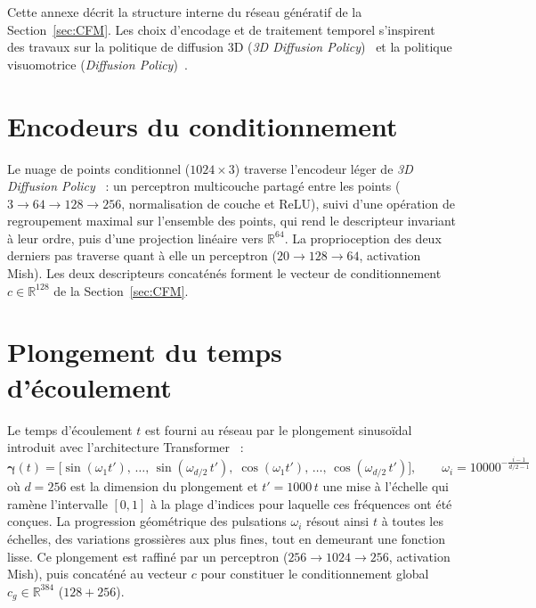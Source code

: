 \label{annexe:unet_details}

Cette annexe décrit la structure interne du réseau génératif de la Section~\ref{sec:CFM}. Les choix d'encodage et de traitement temporel s'inspirent des travaux sur la politique de diffusion 3D (\textit{3D Diffusion Policy})~\cite{Ze2024Diffusion} et la politique visuomotrice (\textit{Diffusion Policy})~\cite{ChiXXXXVisuomotor}.

\section*{Encodeurs du conditionnement}
Le nuage de points conditionnel ($1024\times3$) traverse l'encodeur léger de \textit{3D Diffusion Policy}~\cite{Ze2024Diffusion} : un perceptron multicouche partagé entre les points ($3\to64\to128\to256$, normalisation de couche et ReLU), suivi d'une opération de regroupement maximal sur l'ensemble des points, qui rend le descripteur invariant à leur ordre, puis d'une projection linéaire vers $\mathbb{R}^{64}$. La proprioception des deux derniers pas traverse quant à elle un perceptron ($20\to128\to64$, activation Mish). Les deux descripteurs concaténés forment le vecteur de conditionnement $c\in\mathbb{R}^{128}$ de la Section~\ref{sec:CFM}.

\section*{Plongement du temps d'écoulement}
Le temps d'écoulement $t$ est fourni au réseau par le plongement sinusoïdal introduit avec l'architecture Transformer~\cite{Vaswani2017Attention} :
\begin{equation}\label{eq:sinus_emb}
  \boldsymbol{\gamma}(t) = \bigl[\sin(\omega_1 t'),\,\dots,\,\sin(\omega_{d/2}\, t'),\;\cos(\omega_1 t'),\,\dots,\,\cos(\omega_{d/2}\, t')\bigr], \qquad \omega_i = 10000^{-\frac{i-1}{d/2-1}}
\end{equation}
où $d=256$ est la dimension du plongement et $t'=1000\,t$ une mise à l'échelle qui ramène l'intervalle $[0,1]$ à la plage d'indices pour laquelle ces fréquences ont été conçues. La progression géométrique des pulsations $\omega_i$ résout ainsi $t$ à toutes les échelles, des variations grossières aux plus fines, tout en demeurant une fonction lisse. Ce plongement est raffiné par un perceptron ($256\to1024\to256$, activation Mish), puis concaténé au vecteur $c$ pour constituer le conditionnement global $c_g\in\mathbb{R}^{384}$ ($128+256$).

